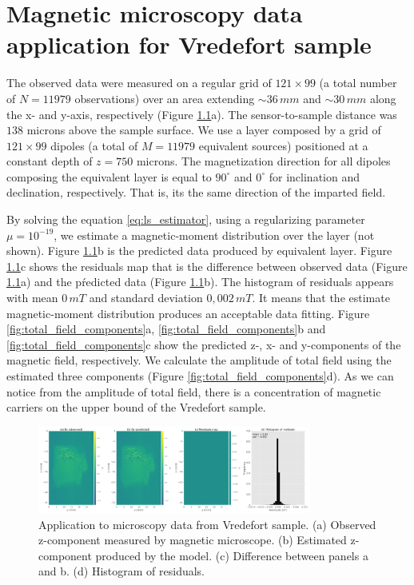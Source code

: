 \chapter{Magnetic microscopy data application for Vredefort sample}

The observed data were measured on a regular grid of $121 \times 99$ (a total number of $N = 11979$ observations) over an area extending $\sim 36 \, mm$ and $\sim 30 \, mm$ along the x- and y-axis, respectively (Figure \ref*{fig:data_fitting}a). The sensor-to-sample distance was $138$ microns above the sample surface. We use a layer composed by a grid of $121 \times 99$ dipoles (a total of $M=11979$ equivalent sources) positioned at a constant depth of $z=750$ microns. The magnetization direction for all dipoles composing the equivalent layer is equal to $90^\circ$ and $0^\circ$ for inclination and declination, respectively. That is, its the same direction of the imparted field. 

By solving the equation \ref*{eq:ls_estimator}, using a regularizing parameter $\mu = 10^{-19}$, we estimate a magnetic-moment distribution over the layer (not shown). Figure \ref*{fig:data_fitting}b is the predicted data produced by equivalent layer. Figure \ref*{fig:data_fitting}c shows the residuals map that is the difference between observed data (Figure \ref*{fig:data_fitting}a) and the pŕedicted data (Figure \ref*{fig:data_fitting}b). The histogram of residuals appears with mean $0 \, mT$ and standard deviation $0,002 \, mT$. It means that the estimate magnetic-moment distribution produces an acceptable data fitting. Figure \ref*{fig:total_field_components}a, \ref*{fig:total_field_components}b and \ref*{fig:total_field_components}c show the predicted z-, x- and y-components of the magnetic field, respectively. We calculate the amplitude of total field using the estimated three components (Figure \ref*{fig:total_field_components}d). As we can notice from the amplitude of total field, there is a concentration of magnetic carriers on the upper bound of the Vredefort sample.      


\begin{figure}[h!]
\centering
\includegraphics[width=0.8\textwidth]{vred/figs/results_data_fitting_eqlayer.png}
\caption{Application to microscopy data from Vredefort sample. (a) Observed z-component measured by magnetic microscope. (b) Estimated z-component produced by the model. (c) Difference between panels a and b. (d) Histogram of residuals. }
\label{fig:data_fitting}
\end{figure}

